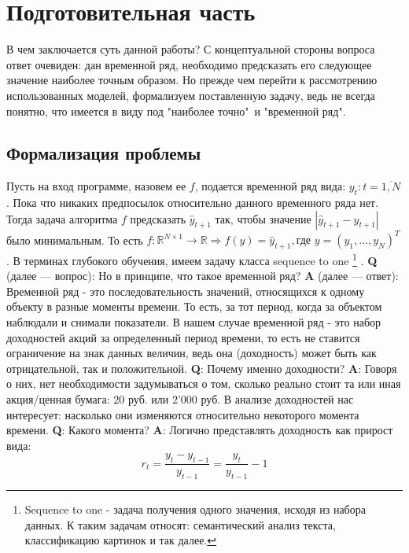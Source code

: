 \section{Подготовительная часть}
	В чем заключается суть данной работы? С концептуальной стороны вопроса ответ очевиден: дан временной ряд, необходимо предсказать его следующее значение наиболее точным образом. Но прежде чем перейти к рассмотрению использованных моделей,  формализуем поставленную задачу, ведь не всегда понятно, что имеется в виду под "наиболее точно"\ и "временной ряд".
	\subsection{Формализация проблемы}
		Пусть на вход программе, назовем ее $f$, подается временной ряд вида: $y_t: t = \overline{1,N}$. Пока что никаких предпосылок относительно данного временного ряда нет. Тогда задача алгоритма $f$ предсказать $\hat{y}_{t + 1}$ так, чтобы значение $|\hat{y}_{t + 1} - y_{t + 1}|$ было минимальным. То есть $f: \mathbb{R}^{N \times 1} \to \mathbb{R} \Rightarrow f(y) = \hat{y}_{t + 1}, \text{где } y = \left(y_1,\ldots,y_N\right)^T$. В терминах глубокого обучения, имеем задачу класса sequence to one \footnote{Sequence to one - задача получения одного значения, исходя из набора данных. К таким задачам относят: семантический анализ текста, классификацию картинок и так далее.} . \textbf{Q} (далее --- вопрос): Но в принципе, что такое временной ряд? \textbf{A} (далее --- ответ): Временной ряд - это последовательность значений, относящихся к одному объекту в разные моменты времени. То есть, за тот период, когда за объектом наблюдали и снимали показатели. В нашем случае временной ряд - это набор доходностей акций за определенный период времени, то есть не ставится ограничение на знак данных величин, ведь она (доходность) может быть как отрицательной, так и положительной. \textbf{Q}: Почему именно доходности? \textbf{A}: Говоря о них, нет необходимости задумываться о том, сколько реально стоит та или иная акция/ценная бумага: $20$ руб. или $2\text{'}000$ руб. В анализе доходностей нас интересует: насколько они изменяются относительно некоторого момента времени. \textbf{Q}: Какого момента? \textbf{A}: Логично представлять доходность как прирост вида:
		\begin{equation}
			r_{t} = \frac{y_{t} - y_{t - 1}}{y_{t - 1}} = \frac{y_{t}}{y_{t - 1}} - 1
		\end{equation}

